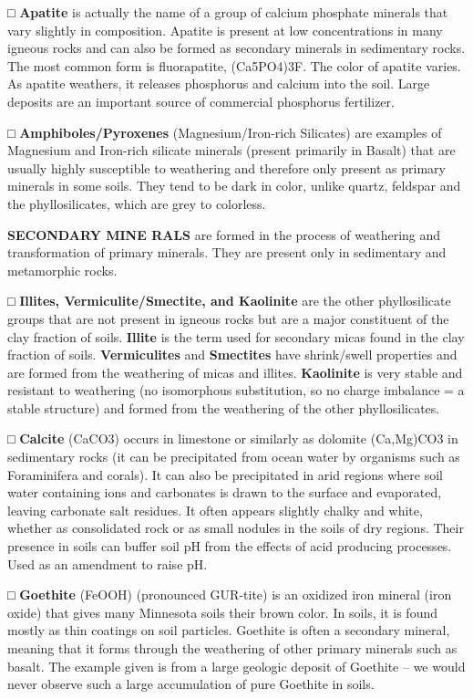 \documentclass[
  letterpaper,
  twocolumn,
  portrait]{scrbook}
\begin{document}
□ \textbf{Apatite} is actually the name of a group of calcium phosphate
minerals that vary slightly in composition. Apatite is present at low
concentrations in many igneous rocks and can also be formed as secondary
minerals in sedimentary rocks. The most common form is fluorapatite,
(Ca5PO4)3F. The color of apatite varies. As apatite weathers, it
releases phosphorus and calcium into the soil. Large deposits are an
important source of commercial phosphorus fertilizer.

□ \textbf{Amphiboles/Pyroxenes} (Magnesium/Iron-rich Silicates) are
examples of Magnesium and Iron-rich silicate minerals (present primarily
in Basalt) that are usually highly susceptible to weathering and
therefore only present as primary minerals in some soils. They tend to
be dark in color, unlike quartz, feldspar and the phyllosilicates, which
are grey to colorless.

\textbf{SECONDARY MINE RALS} are formed in the process of weathering and
transformation of primary minerals. They are present only in sedimentary
and metamorphic rocks.

□ \textbf{Illites, Vermiculite/Smectite, and Kaolinite} are the other
phyllosilicate groups that are not present in igneous rocks but are a
major constituent of the clay fraction of soils. \textbf{Illite} is the
term used for secondary micas found in the clay fraction of soils.
\textbf{Vermiculites} and \textbf{Smectites} have shrink/swell
properties and are formed from the weathering of micas and illites.
\textbf{Kaolinite} is very stable and resistant to weathering (no
isomorphous substitution, so no charge imbalance = a stable structure)
and formed from the weathering of the other phyllosilicates.

□ \textbf{Calcite} (CaCO3) occurs in limestone or similarly as dolomite
(Ca,Mg)CO3 in sedimentary rocks (it can be precipitated from ocean water
by organisms such as Foraminifera and corals). It can also be
precipitated in arid regions where soil water containing ions and
carbonates is drawn to the surface and evaporated, leaving carbonate
salt residues. It often appears slightly chalky and white, whether as
consolidated rock or as small nodules in the soils of dry regions. Their
presence in soils can buffer soil pH from the effects of acid producing
processes. Used as an amendment to raise pH.

□ \textbf{Goethite} (FeOOH) (pronounced GUR-tite) is an oxidized iron
mineral (iron oxide) that gives many Minnesota soils their brown color.
In soils, it is found mostly as thin coatings on soil particles.
Goethite is often a secondary mineral, meaning that it forms through the
weathering of other primary minerals such as basalt. The example given
is from a large geologic deposit of Goethite -- we would never observe
such a large accumulation of pure Goethite in soils.
\end{document}

